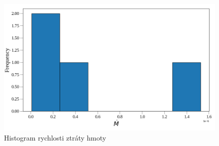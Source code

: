 \documentclass[a4paper,11pt]{article}
\begin{document}
\newpage
    \begin{figure}[H]
        \centering
        \includegraphics[scale=0.5]{hist}
        \captionsetup{justification=centering, font=footnotesize}
        \caption{Histogram rychlosti ztráty hmoty}
        \label{fig:hist}
    \end{figure}

    
    \nocite{*}
    
\end{document}
